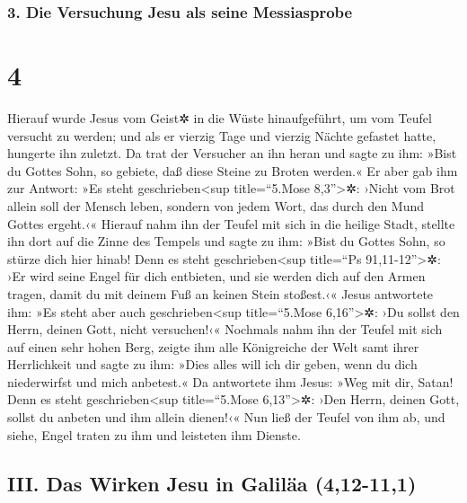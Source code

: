 \hypertarget{die-versuchung-jesu-als-seine-messiasprobe}{%
\subsubsection{3. Die Versuchung Jesu als seine
Messiasprobe}\label{die-versuchung-jesu-als-seine-messiasprobe}}

\hypertarget{section-3}{%
\section{4}\label{section-3}}

 Hierauf wurde Jesus vom Geist✲ in die Wüste
hinaufgeführt, um vom Teufel versucht zu werden;  und als
er vierzig Tage und vierzig Nächte gefastet hatte, hungerte ihn zuletzt.
 Da trat der Versucher an ihn heran und sagte zu ihm:
»Bist du Gottes Sohn, so gebiete, daß diese Steine zu Broten werden.«
 Er aber gab ihm zur Antwort: »Es steht
geschrieben\textless sup title=``5.Mose 8,3''\textgreater✲: ›Nicht vom
Brot allein soll der Mensch leben, sondern von jedem Wort, das durch den
Mund Gottes ergeht.‹«  Hierauf nahm ihn der Teufel mit
sich in die heilige Stadt, stellte ihn dort auf die Zinne des Tempels
 und sagte zu ihm: »Bist du Gottes Sohn, so stürze dich
hier hinab! Denn es steht geschrieben\textless sup title=``Ps
91,11-12''\textgreater✲: ›Er wird seine Engel für dich entbieten, und
sie werden dich auf den Armen tragen, damit du mit deinem Fuß an keinen
Stein stoßest.‹«  Jesus antwortete ihm: »Es steht aber
auch geschrieben\textless sup title=``5.Mose 6,16''\textgreater✲: ›Du
sollst den Herrn, deinen Gott, nicht versuchen!‹« 
Nochmals nahm ihn der Teufel mit sich auf einen sehr hohen Berg, zeigte
ihm alle Königreiche der Welt samt ihrer Herrlichkeit  und
sagte zu ihm: »Dies alles will ich dir geben, wenn du dich niederwirfst
und mich anbetest.«  Da antwortete ihm Jesus: »Weg mit
dir, Satan! Denn es steht geschrieben\textless sup title=``5.Mose
6,13''\textgreater✲: ›Den Herrn, deinen Gott, sollst du anbeten und ihm
allein dienen!‹«  Nun ließ der Teufel von ihm ab, und
siehe, Engel traten zu ihm und leisteten ihm Dienste.

\hypertarget{iii.-das-wirken-jesu-in-galiluxe4a-412-111}{%
\subsection{III. Das Wirken Jesu in Galiläa
(4,12-11,1)}\label{iii.-das-wirken-jesu-in-galiluxe4a-412-111}}

